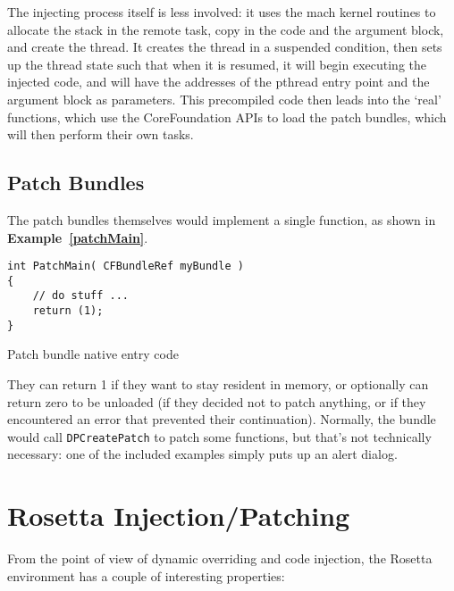 \documentclass[english]{article}
\begin{document}
The injecting process itself is less involved: it uses the mach kernel routines to allocate the stack in the remote task, copy in the code and the argument block, and create the thread. It creates the thread in a suspended condition, then sets up the thread state such that when it is resumed, it will begin executing the injected code, and will have the addresses of the pthread entry point and the argument block as parameters. This precompiled code then leads into the `real' functions, which use the CoreFoundation APIs to load the patch bundles, which will then perform their own tasks.

\subsection{Patch Bundles}
The patch bundles themselves would implement a single function, as shown in \textbf{Example~\ref{patchMain}}.

\begin{sourcecode}
\begin{verbatim}
int PatchMain( CFBundleRef myBundle )
{
	// do stuff ...
	return (1);
}
\end{verbatim}
\caption{Patch bundle native entry code}
\label{patchMain}
\end{sourcecode}

They can return 1 if they want to stay resident in memory, or optionally can return zero to be unloaded (if they decided not to patch anything, or if they encountered an error that prevented their continuation). Normally, the bundle would call \texttt{DPCreatePatch} to patch some functions, but that's not technically necessary: one of the included examples simply puts up an alert dialog.

\section{Rosetta Injection/Patching}

From the point of view of dynamic overriding and code injection, the Rosetta environment has a couple of interesting properties:
\end{document}
